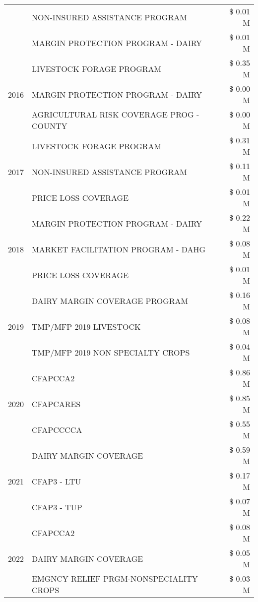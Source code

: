 \begin{tabular}{llr}
 & NON-INSURED ASSISTANCE PROGRAM & \$ 0.01 M \\
 & MARGIN PROTECTION PROGRAM - DAIRY & \$ 0.01 M \\
\cline{1-3}
\multirow[t]{3}{*}{2016} & LIVESTOCK FORAGE PROGRAM & \$ 0.35 M \\
 & MARGIN PROTECTION PROGRAM - DAIRY & \$ 0.00 M \\
 & AGRICULTURAL RISK COVERAGE PROG - COUNTY & \$ 0.00 M \\
\cline{1-3}
\multirow[t]{3}{*}{2017} & LIVESTOCK FORAGE PROGRAM & \$ 0.31 M \\
 & NON-INSURED ASSISTANCE PROGRAM & \$ 0.11 M \\
 & PRICE LOSS COVERAGE & \$ 0.01 M \\
\cline{1-3}
\multirow[t]{3}{*}{2018} & MARGIN PROTECTION PROGRAM - DAIRY & \$ 0.22 M \\
 & MARKET FACILITATION PROGRAM - DAHG & \$ 0.08 M \\
 & PRICE LOSS COVERAGE & \$ 0.01 M \\
\cline{1-3}
\multirow[t]{3}{*}{2019} & DAIRY MARGIN COVERAGE PROGRAM & \$ 0.16 M \\
 & TMP/MFP 2019 LIVESTOCK & \$ 0.08 M \\
 & TMP/MFP 2019 NON SPECIALTY CROPS & \$ 0.04 M \\
\cline{1-3}
\multirow[t]{3}{*}{2020} & CFAPCCA2 & \$ 0.86 M \\
 & CFAPCARES & \$ 0.85 M \\
 & CFAPCCCCA & \$ 0.55 M \\
\cline{1-3}
\multirow[t]{3}{*}{2021} & DAIRY MARGIN COVERAGE & \$ 0.59 M \\
 & CFAP3 - LTU & \$ 0.17 M \\
 & CFAP3 - TUP & \$ 0.07 M \\
\cline{1-3}
\multirow[t]{3}{*}{2022} & CFAPCCA2 & \$ 0.08 M \\
 & DAIRY MARGIN COVERAGE & \$ 0.05 M \\
 & EMGNCY RELIEF PRGM-NONSPECIALITY CROPS & \$ 0.03 M \\
\cline{1-3}
\bottomrule
\end{tabular}
